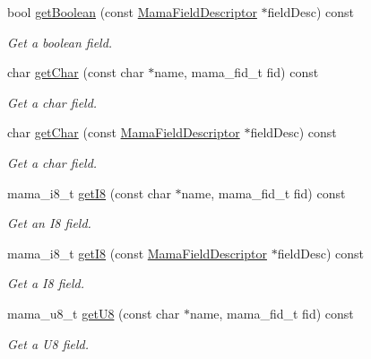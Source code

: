 \begin{DoxyCompactItemize}
bool \hyperlink{classWombat_1_1MamaMsg_a5a2870c262c77993f68c5684bc34b216}{getBoolean} (const \hyperlink{classWombat_1_1MamaFieldDescriptor}{MamaFieldDescriptor} $\ast$fieldDesc) const 
\begin{DoxyCompactList}\small\item\em Get a boolean field. \item\end{DoxyCompactList}\item 
char \hyperlink{classWombat_1_1MamaMsg_ad454a523e50013a4e9451000dfc105e5}{getChar} (const char $\ast$name, mama\_\-fid\_\-t fid) const 
\begin{DoxyCompactList}\small\item\em Get a char field. \item\end{DoxyCompactList}\item 
char \hyperlink{classWombat_1_1MamaMsg_a273a47c895900283806a71d8af790d06}{getChar} (const \hyperlink{classWombat_1_1MamaFieldDescriptor}{MamaFieldDescriptor} $\ast$fieldDesc) const 
\begin{DoxyCompactList}\small\item\em Get a char field. \item\end{DoxyCompactList}\item 
mama\_\-i8\_\-t \hyperlink{classWombat_1_1MamaMsg_a42a2c16c2be4610858498ac834f8c839}{getI8} (const char $\ast$name, mama\_\-fid\_\-t fid) const 
\begin{DoxyCompactList}\small\item\em Get an I8 field. \item\end{DoxyCompactList}\item 
mama\_\-i8\_\-t \hyperlink{classWombat_1_1MamaMsg_ab7a9aa2455ae2a33949bf3bdadc6efbc}{getI8} (const \hyperlink{classWombat_1_1MamaFieldDescriptor}{MamaFieldDescriptor} $\ast$fieldDesc) const 
\begin{DoxyCompactList}\small\item\em Get a I8 field. \item\end{DoxyCompactList}\item 
mama\_\-u8\_\-t \hyperlink{classWombat_1_1MamaMsg_a6bf8202a0808391d8c985a8e99f59065}{getU8} (const char $\ast$name, mama\_\-fid\_\-t fid) const 
\begin{DoxyCompactList}\small\item\em Get a U8 field. \item\end{DoxyCompactList}\item 

\end{DoxyCompactItemize}
